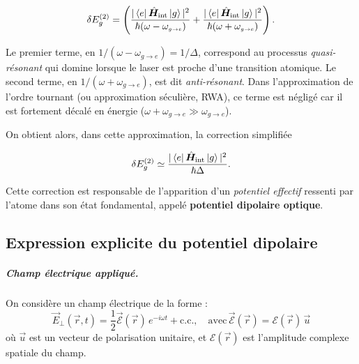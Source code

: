 \begin{itemize}[label = $\bullet$]
\begin{equation}
\delta E_g^{(2)} =  
 \left( 
\frac{|\bra{e} \hat{\bm{H}}_{\text{int}} \ket{g}|^2}{\hbar(\omega - \omega_{\scriptscriptstyle g\rightarrow e})}
+ \frac{|\bra{e} \hat{\bm{H}}_{\text{int}} \ket{g}|^2}{\hbar(\omega + \omega_{\scriptscriptstyle g\rightarrow e})}
\right).
\end{equation}

Le premier terme, en \(1/(\omega - \omega_{\scriptscriptstyle g\rightarrow e}) = 1/\Delta\), correspond au processus \emph{quasi-résonant} qui domine lorsque le laser est proche d’une transition atomique. 
Le second terme, en \(1/(\omega + \omega_{\scriptscriptstyle g\rightarrow e})\), est dit \emph{anti-résonant}. 
Dans l’approximation de l’ordre tournant (ou approximation séculière, RWA), ce terme est négligé car il est fortement décalé en énergie (\(\omega + \omega_{\scriptscriptstyle g\rightarrow e} \gg \omega_{\scriptscriptstyle g\rightarrow e}\)).

On obtient alors, dans cette approximation, la correction simplifiée

\begin{equation}
\delta E_g^{(2)} \simeq \frac{|\bra{e} \hat{\bm{H}}_{\text{int}} \ket{g}|^2}{\hbar \Delta}. \label{chap7:eq.E_g(2).1}
\end{equation}

\end{itemize}

Cette correction est responsable de l’apparition d’un \emph{potentiel effectif} ressenti par l’atome dans son état fondamental, appelé \textbf{potentiel dipolaire optique}.



\subsection{Expression explicite du potentiel dipolaire}

\subparagraph{Champ électrique appliqué.}
On considère un champ électrique de la forme :
\begin{equation}\label{chap7:eq.elec.clas.1}
\vec{E}_\perp(\vec{r},t) = \frac{1}{2} \vec{\mathcal{E}}(\vec{r}) \, e^{-i\omega t} + \text{c.c.}, \quad \mbox{avec}  \, \vec{\mathcal{E}}(\vec{r}) =  {\mathcal{E}}(\vec{r})\, \vec{u}
\end{equation}
où \( \vec{u} \) est un vecteur de polarisation unitaire, et \( {\mathcal{E}}(\vec{r}) \) est l’amplitude complexe spatiale du champ.


